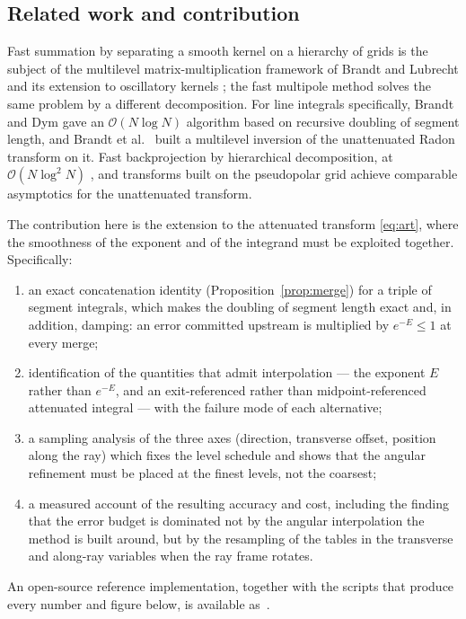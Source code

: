 \documentclass[11pt]{article}
\newcommand{\bigO}{\mathcal{O}}
\begin{document}
\subsection{Related work and contribution}

Fast summation by separating a smooth kernel on a hierarchy of grids is the
subject of the multilevel matrix-multiplication framework of Brandt and
Lubrecht \citep{brandtlubrecht1990} and its extension to oscillatory kernels
\citep{brandt1991}; the fast multipole method \citep{greengardrokhlin1987}
solves the same problem by a different decomposition. For line integrals
specifically, Brandt and Dym \citep{brandtdym1999} gave an $\bigO(N\log N)$
algorithm based on recursive doubling of segment length, and Brandt et al.\
\citep{brandtmann2000} built a multilevel inversion of the unattenuated Radon
transform on it. Fast backprojection by hierarchical decomposition, at
$\bigO(N\log^2 N)$ \citep{basubresler2000}, and transforms built on the
pseudopolar grid \citep{averbuch2008} achieve comparable asymptotics for the
unattenuated transform.

The contribution here is the extension to the attenuated transform
\eqref{eq:art}, where the smoothness of the exponent and of the integrand must
be exploited together. Specifically:
\begin{enumerate}
\item an exact concatenation identity (Proposition~\ref{prop:merge}) for a
  triple of segment integrals, which makes the doubling of segment length
  exact and, in addition, damping: an error committed upstream is multiplied by
  $e^{-E}\le 1$ at every merge;
\item identification of the quantities that admit interpolation --- the
  exponent $E$ rather than $e^{-E}$, and an exit-referenced rather than
  midpoint-referenced attenuated integral --- with the failure mode of each
  alternative;
\item a sampling analysis of the three axes (direction, transverse offset,
  position along the ray) which fixes the level schedule and shows that the
  angular refinement must be placed at the finest levels, not the coarsest;
\item a measured account of the resulting accuracy and cost, including the
  finding that the error budget is dominated not by the angular interpolation
  the method is built around, but by the resampling of the tables in the
  transverse and along-ray variables when the ray frame rotates.
\end{enumerate}
An open-source reference implementation, together with the scripts that
produce every number and figure below, is available
as~\citep{tomogrid}.
\end{document}
